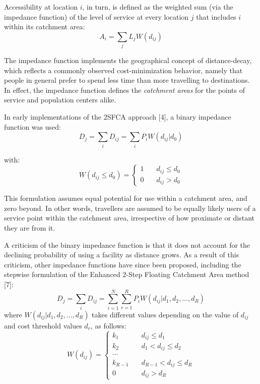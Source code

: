 \documentclass[10pt,letterpaper]{article}
\begin{document}
Accessibility at location \(i\), in turn, is defined as the weighted sum
(via the impedance function) of the level of service at every location
\(j\) that includes \(i\) within its catchment area: \[
A_i = \sum_j{L_jW(d_{ij})}
\]

The impedance function implements the geographical concept of
distance-decay, which reflects a commonly observed cost-minimization
behavior, namely that people in general prefer to spend less time than
more travelling to destinations. In effect, the impedance function
defines the \emph{catchment areas} for the points of service and
population centers alike.

In early implementations of the 2SFCA approach {[}4{]}, a binary
impedance function was used: \[
D_j = \sum_iD_{ij} = \sum_iP_iW(d_{ij}|d_0)
\]

with: \[
W(d_{ij}\leq d_0) = \left\{
        \begin{array}{ll}
            1 & \quad d_{ij} \leq d_0 \\
            0 & \quad d_{ij} > d_0
        \end{array}
    \right.
\]

This formulation assumes equal potential for use within a catchment
area, and zero beyond. In other words, travellers are assumed to be
equally likely users of a service point within the catchment area,
irrespective of how proximate or distant they are from it.

A criticism of the binary impedance function is that it does not account
for the declining probability of using a facility as distance grows. As
a result of this criticism, other impedance functions have since been
proposed, including the stepwise formulation of the Enhanced 2-Step
Floating Catchment Area method {[}7{]}: \[
D_j = \sum_iD_{ij} = \sum_{i=1}^N\sum_{r=1}^R P_iW(d_{ij}|d_1, d_2, \dots, d_R)
\] where \(W(d_{ij}|d_1, d_2, \dots, d_R)\) takes different values
depending on the value of \(d_{ij}\) and cost threshold values \(d_r\),
as follows: \[
W(d_{ij}) = \left\{
        \begin{array}{ll}
            k_1 & \quad d_{ij} \leq d_1 \\
            k_2 & \quad d_1 < d_{ij} \leq d_2 \\
            \dotsb \\
            k_{R-1} & \quad d_{R-1} < d_{ij} \leq d_R \\
            0 & \quad d_{ij} > d_R
        \end{array}
    \right.
\]
\end{document}
